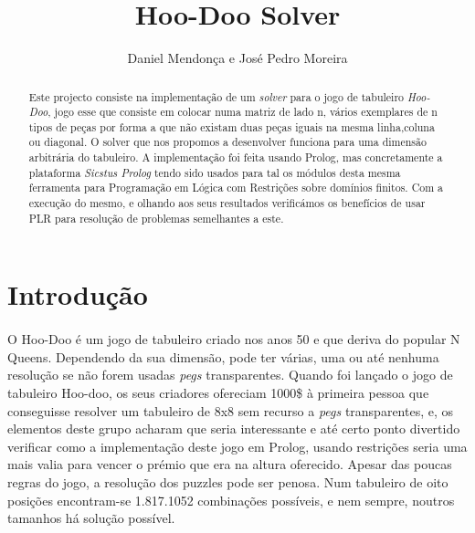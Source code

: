 \documentclass{llncs}
\begin{document}
\title{Hoo-Doo Solver}

\author{Daniel Mendon\c{c}a e Jos\'{e} Pedro Moreira}


\maketitle
%
\begin{abstract}
Este projecto consiste na implementa\c{c}\~{a}o de um \textit{solver} para o jogo de tabuleiro \textit{Hoo-Doo}, jogo esse que consiste em colocar numa matriz de lado n, v\'{a}rios exemplares de n tipos de pe\c{c}as por forma a que n\~{a}o existam duas pe\c{c}as iguais na mesma linha,coluna ou diagonal. O solver que nos propomos a desenvolver funciona para uma dimens\~{a}o arbitr\'{a}ria do tabuleiro. A implementa\c{c}\~{a}o foi feita usando Prolog, mas concretamente a plataforma \emph{Sicstus Prolog}  tendo sido usados para tal os m\'{o}dulos desta mesma ferramenta para Programa\c{c}\~{a}o em L\'{o}gica com Restri\c{c}\~{o}es sobre dom\'{i}nios finitos. Com a execu\c{c}\~{a}o do mesmo, e olhando aos seus resultados verific\'{a}mos os benef\'{i}cios de usar PLR para resolu\c{c}\~{a}o de problemas semelhantes a este.
\end{abstract}
%
\section{Introdu\c{c}\~{a}o}
\paragraph*{}
O Hoo-Doo \'{e} um jogo de tabuleiro criado nos anos 50 e que deriva do popular N Queens. Dependendo da sua dimens\~{a}o, pode ter v\'{a}rias, uma ou at\'{e} nenhuma resolu\c{c}\~{a}o se n\~{a}o forem usadas \emph{pegs} transparentes. Quando foi lan\c{c}ado o jogo de tabuleiro Hoo-doo, os seus criadores ofereciam 1000\$ \`{a} primeira pessoa que conseguisse resolver um tabuleiro de 8x8 sem recurso a \emph{pegs} transparentes, e, os elementos deste grupo acharam que seria interessante e at\'{e} certo ponto divertido verificar como a implementa\c{c}\~{a}o deste jogo em Prolog, usando restri\c{c}\~{o}es seria uma mais valia para vencer o pr\'{e}mio que era na altura oferecido. Apesar das poucas regras do jogo, a resolu\c{c}\~{a}o dos puzzles pode ser penosa. Num tabuleiro de oito posi\c{c}\~{o}es encontram-se 1.817.1052 combina\c{c}\~{o}es poss\'{i}veis, e nem sempre, noutros tamanhos h\'{a} solu\c{c}\~{a}o poss\'{i}vel.
\end{document}
